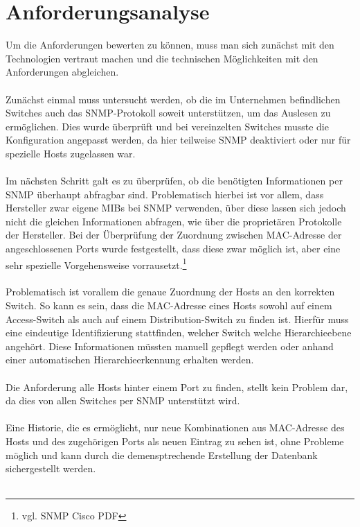 \section{Anforderungsanalyse}
\label{sec:anfanalyse}

Um die Anforderungen bewerten zu können, muss man sich zunächst mit den Technologien vertraut machen und die technischen Möglichkeiten mit den Anforderungen abgleichen.\\\\
Zunächst einmal muss untersucht werden, ob die im Unternehmen befindlichen Switches auch das SNMP-Protokoll soweit unterstützen, um das Auslesen zu ermöglichen.
Dies wurde überprüft und bei vereinzelten Switches musste die Konfiguration angepasst werden, da hier teilweise SNMP deaktiviert oder nur für spezielle Hosts zugelassen war.\\\\
Im nächsten Schritt galt es zu überprüfen, ob die benötigten Informationen per SNMP überhaupt abfragbar sind. Problematisch hierbei ist vor allem, dass Hersteller zwar eigene MIBs bei SNMP verwenden, über diese lassen sich jedoch nicht die gleichen Informationen abfragen, wie über die proprietären Protokolle der Hersteller.
Bei der Überprüfung der Zuordnung zwischen MAC-Adresse der angeschlossenen Ports wurde festgestellt, dass diese zwar möglich ist, aber eine sehr spezielle Vorgehensweise vorrausetzt.\footnote{vgl. SNMP Cisco PDF}\\\\
Problematisch ist vorallem die genaue Zuordnung der Hosts an den korrekten Switch. So kann es sein, dass die MAC-Adresse eines Hosts sowohl auf einem Access-Switch als auch auf einem Distribution-Switch zu finden ist.
Hierfür muss eine eindeutige Identifizierung stattfinden, welcher Switch welche Hierarchieebene angehört. Diese Informationen müssten manuell gepflegt werden oder anhand einer automatischen Hierarchieerkennung erhalten werden.\\\\
Die Anforderung alle Hosts hinter einem Port zu finden, stellt kein Problem dar, da dies von allen Switches per SNMP unterstützt wird.\\\\
Eine Historie, die es ermöglicht, nur neue Kombinationen aus MAC-Adresse des Hosts und des zugehörigen Ports als neuen Eintrag zu sehen ist, ohne Probleme möglich und kann durch die demensptrechende Erstellung der Datenbank sichergestellt werden.\\\\
